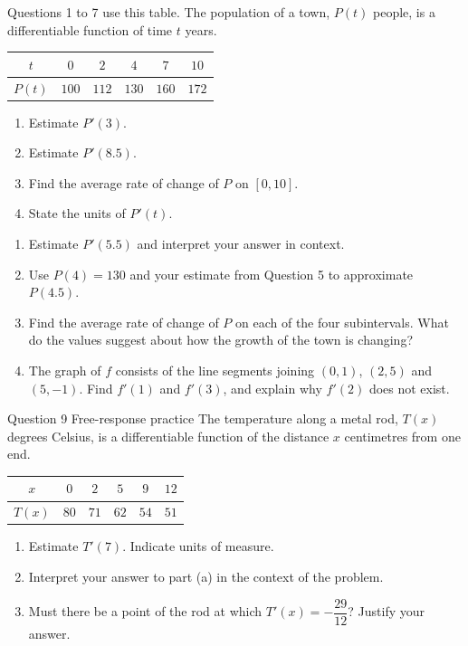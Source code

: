 \documentclass[11pt]{article}
\begin{document}
\newpage
{}
Questions 1 to 7 use this table. The population of a town, $P(t)$ people, is a differentiable function of time $t$ years.\begin{center}\renewcommand{\arraystretch}{1.25}\begin{tabular}{|c|c|c|c|c|c|}\hline $t$ & $0$ & $2$ & $4$ & $7$ & $10$ \\ \hline $P(t)$ & $100$ & $112$ & $130$ & $160$ & $172$ \\ \hline\end{tabular}\end{center}
\begin{enumerate}[leftmargin=*,itemsep=2pt]
  \item Estimate $P'(3)$.\work{2.3cm}
  \item Estimate $P'(8.5)$.\work{2.3cm}
  \item Find the average rate of change of $P$ on $[0,10]$.\work{2.3cm}
  \item State the units of $P'(t)$.\work{2.3cm}
\end{enumerate}

\begin{enumerate}[leftmargin=*,itemsep=2pt,start=5]
  \item Estimate $P'(5.5)$ and interpret your answer in context.\work{2.8cm}
  \item Use $P(4)=130$ and your estimate from Question 5 to approximate $P(4.5)$.\work{2.8cm}
  \item Find the average rate of change of $P$ on each of the four subintervals. What do the values suggest about how the growth of the town is changing?\work{2.8cm}
  \item The graph of $f$ consists of the line segments joining $(0,1)$, $(2,5)$ and $(5,-1)$. Find $f'(1)$ and $f'(3)$, and explain why $f'(2)$ does not exist.\work{2.8cm}
\end{enumerate}

\begin{frbox}{Question 9 \textperiodcentered{} Free-response practice}
The temperature along a metal rod, $T(x)$ degrees Celsius, is a differentiable function of the distance $x$ centimetres from one end.\begin{center}\renewcommand{\arraystretch}{1.25}\begin{tabular}{|c|c|c|c|c|c|}\hline $x$ & $0$ & $2$ & $5$ & $9$ & $12$ \\ \hline $T(x)$ & $80$ & $71$ & $62$ & $54$ & $51$ \\ \hline\end{tabular}\end{center}
\begin{enumerate}[label=(\alph*),leftmargin=*,itemsep=2pt]
  \item Estimate $T'(7)$. Indicate units of measure.\work{2.6cm}
  \item Interpret your answer to part (a) in the context of the problem.\work{2.6cm}
  \item Must there be a point of the rod at which $T'(x)=-\dfrac{29}{12}$? Justify your answer.\work{2.6cm}
\end{enumerate}
\end{frbox}
\end{document}
